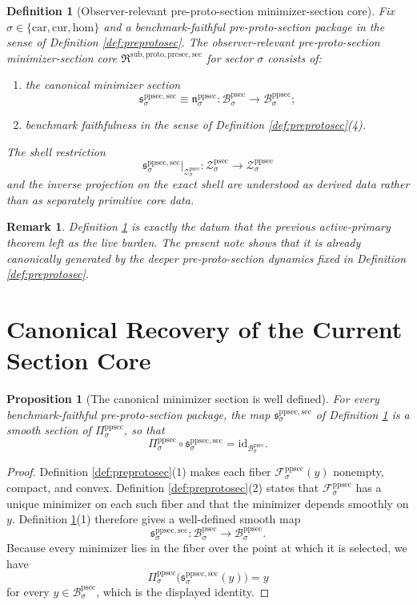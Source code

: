 \documentclass[11pt]{article}
\newcommand{\Car}{\mathrm{car}}
\newcommand{\Cur}{\mathrm{cur}}
\newcommand{\Hom}{\mathrm{hom}}
\newcommand{\ProtoSectionBody}[1]{\mathcal B_{#1}^{\mathrm{psec}}}
\newcommand{\ProtoSectionShell}[1]{\mathcal Z_{#1}^{\mathrm{psec}}}
\newcommand{\PreProtoSectionBody}[1]{\mathcal B_{#1}^{\mathrm{ppsec}}}
\newcommand{\PreProtoSectionProj}[1]{\Pi_{#1}^{\mathrm{ppsec}}}
\newcommand{\PreProtoSectionFiber}[2]{\mathcal F_{#1}^{\mathrm{ppsec}}(#2)}
\newcommand{\PreProtoSectionProtoMin}[1]{\mathfrak n_{#1}^{\mathrm{ppsec}}}
\newcommand{\PreProtoSectionFunctional}[1]{\mathscr F_{#1}^{\mathrm{ppsec}}}
\newcommand{\PreProtoSectionShell}[1]{\mathcal Z_{#1}^{\mathrm{ppsec}}}
\newcommand{\PreProtoSectionMinSectionCore}{\mathfrak R^{\mathrm{sub,proto,presec,sec}}}
\newcommand{\PreProtoSectionMinSection}[1]{\mathfrak s_{#1}^{\mathrm{ppsec,sec}}}
\newtheorem{definition}{Definition}
\newtheorem{proposition}{Proposition}
\newtheorem{remark}{Remark}
\begin{document}
\begin{definition}[Observer-relevant pre-proto-section minimizer-section core]
\label{def:sectioncore}
Fix \(\sigma\in\{\Car,\Cur,\Hom\}\) and a benchmark-faithful pre-proto-section package in the sense of Definition \ref{def:preprotosec}. The \emph{observer-relevant pre-proto-section minimizer-section core} \(\PreProtoSectionMinSectionCore\) for sector \(\sigma\) consists of:
\begin{enumerate}
    \item the canonical minimizer section
    \[
    \PreProtoSectionMinSection{\sigma}
    \equiv
    \PreProtoSectionProtoMin{\sigma}
    :
    \ProtoSectionBody{\sigma}\to\PreProtoSectionBody{\sigma};
    \]
    \item benchmark faithfulness in the sense of Definition \ref{def:preprotosec}(4).
\end{enumerate}
The shell restriction
\[
\PreProtoSectionMinSection{\sigma}\big|_{\ProtoSectionShell{\sigma}}
:
\ProtoSectionShell{\sigma}\to\PreProtoSectionShell{\sigma}
\]
and the inverse projection on the exact shell are understood as derived data rather than as separately primitive core data.
\end{definition}

\begin{remark}
Definition \ref{def:sectioncore} is exactly the datum that the previous active-primary theorem left as the live burden. The present note shows that it is already canonically generated by the deeper pre-proto-section dynamics fixed in Definition \ref{def:preprotosec}.
\end{remark}

\section{Canonical Recovery of the Current Section Core}

\begin{proposition}[The canonical minimizer section is well defined]
\label{prop:section}
For every benchmark-faithful pre-proto-section package, the map \(\PreProtoSectionMinSection{\sigma}\) of Definition \ref{def:sectioncore} is a smooth section of \(\PreProtoSectionProj{\sigma}\), so that
\[
\PreProtoSectionProj{\sigma}\circ\PreProtoSectionMinSection{\sigma}
=
\mathrm{id}_{\ProtoSectionBody{\sigma}}.
\]
\end{proposition}

\begin{proof}
Definition \ref{def:preprotosec}(1) makes each fiber \(\PreProtoSectionFiber{\sigma}{y}\) nonempty, compact, and convex. Definition \ref{def:preprotosec}(2) states that \(\PreProtoSectionFunctional{\sigma}\) has a unique minimizer on each such fiber and that the minimizer depends smoothly on \(y\). Definition \ref{def:sectioncore}(1) therefore gives a well-defined smooth map
\[
\PreProtoSectionMinSection{\sigma}:\ProtoSectionBody{\sigma}\to\PreProtoSectionBody{\sigma}.
\]
Because every minimizer lies in the fiber over the point at which it is selected, we have
\[
\PreProtoSectionProj{\sigma}\bigl(\PreProtoSectionMinSection{\sigma}(y)\bigr)=y
\]
for every \(y\in\ProtoSectionBody{\sigma}\), which is the displayed identity.
\end{proof}
\end{document}

